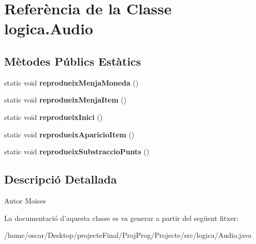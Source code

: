 \hypertarget{classlogica_1_1_audio}{\section{Referència de la Classe logica.\+Audio}
\label{classlogica_1_1_audio}
}
\subsection*{Mètodes Públics Estàtics}
\begin{DoxyCompactItemize}
\item 
\hypertarget{classlogica_1_1_audio_a36e406167c180e2bdb7c646c7a4c645d}{static void {\bfseries reprodueix\+Menja\+Moneda} ()}\label{classlogica_1_1_audio_a36e406167c180e2bdb7c646c7a4c645d}

\item 
\hypertarget{classlogica_1_1_audio_a6a897d93efd13a0c96d4518bf7e041c0}{static void {\bfseries reprodueix\+Menja\+Item} ()}\label{classlogica_1_1_audio_a6a897d93efd13a0c96d4518bf7e041c0}

\item 
\hypertarget{classlogica_1_1_audio_a5079c1c587da3b4bf704b5e20314b0c5}{static void {\bfseries reprodueix\+Inici} ()}\label{classlogica_1_1_audio_a5079c1c587da3b4bf704b5e20314b0c5}

\item 
\hypertarget{classlogica_1_1_audio_af34af5f6c05baea4b1044beda801581b}{static void {\bfseries reprodueix\+Aparicio\+Item} ()}\label{classlogica_1_1_audio_af34af5f6c05baea4b1044beda801581b}

\item 
\hypertarget{classlogica_1_1_audio_ada3a781e4d6bb88233054514b439540d}{static void {\bfseries reprodueix\+Substraccio\+Punts} ()}\label{classlogica_1_1_audio_ada3a781e4d6bb88233054514b439540d}

\end{DoxyCompactItemize}


\subsection{Descripció Detallada}
\begin{DoxyAuthor}{Autor}
Moises 
\end{DoxyAuthor}


La documentació d'aquesta classe es va generar a partir del següent fitxer\+:\begin{DoxyCompactItemize}
\item 
/home/oscar/\+Desktop/projecte\+Final/\+Proj\+Prog/\+Projecte/src/logica/Audio.\+java\end{DoxyCompactItemize}
